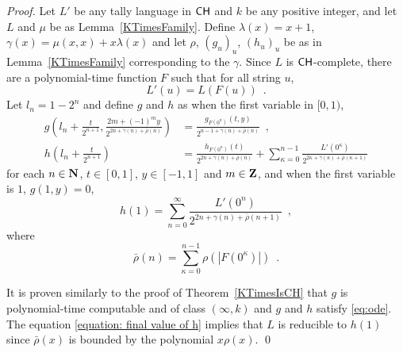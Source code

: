 \begin{proof}
Let $L'$ be any tally language in $\mathsf{CH}$ and $k$ be any positive integer,
and let $L$ and $\mu$ be as Lemma~\ref{KTimesFamily}.
Define $
\lambda(x) = x + 1
$, $
\gamma(x) = \mu(x, x) + x \lambda(x)
$ and let $\rho$, $(g_u)_u$, $(h_u)_u$ be  as in Lemma~\ref{KTimesFamily} 
corresponding to the $\gamma$.
Since $L$ is $\mathsf{CH}$-complete,
there are a polynomial-time function $F$ such that for all string $u$,
\begin{equation}
 L'(u) =  L(F(u)) \enspace .
\end{equation}
Let $
l_n = 1 - 2^n
$ and define $g$ and $h$ as when the first variable in  $[0,1)$,
\begin{align}
 g \left(l_n + \frac{t}{2^{n+1}}, \frac{2m+(-1)^m y}{2^{2n+\gamma(n)+\bar{\rho}(n)}} \right)
 &=
 \frac{g_{F(0^n)}(t, y)}{2^{n-1+\gamma(n)+\bar{\rho}(n)}} \enspace ,
 \\
 h \left( l_n + \frac{t}{2^{n+1}} \right)
 &=
 \frac{h_{F(0^n)}(t)}{2^{2n+\gamma(n)+\bar{\rho}(n)}}
 + \sum^{n-1}_{\kappa = 0} \frac{L'(0^\kappa)}{2^{2\kappa+\gamma(\kappa)+\bar{\rho}(\kappa+1)}}
\end{align}
for each $n \in \mathbf N$, $t \in [0,1]$, $y \in [-1, 1]$ and $m \in \mathbf Z$,
and when the first variable is $1$,
$g(1, y) = 0$,
\begin{equation} \label{equation: final value of h}
 h(1) = 
 \sum^\infty_{n = 0} \frac{L'(0^n)}{2^{2n+\gamma(n)+\bar{\rho}(n+1)}} \enspace ,
\end{equation}
where
\begin{equation}
\bar{\rho}(n) = \sum^{n-1}_{\kappa = 0} \rho(|F(0^{\kappa})|) \enspace .
\end{equation}

It is proven similarly to the proof of Theorem~\ref{KTimesIsCH} 
that $g$ is polynomial-time computable and of class $(\infty, k)$
and $g$ and $h$ satisfy \eqref{eq:ode}.
The equation \eqref{equation: final value of h} implies 
that $L$ is reducible to $h(1)$
since $\bar{\rho}(x)$ is bounded by the polynomial $x \rho(x)$.
\qed
\end{proof}
